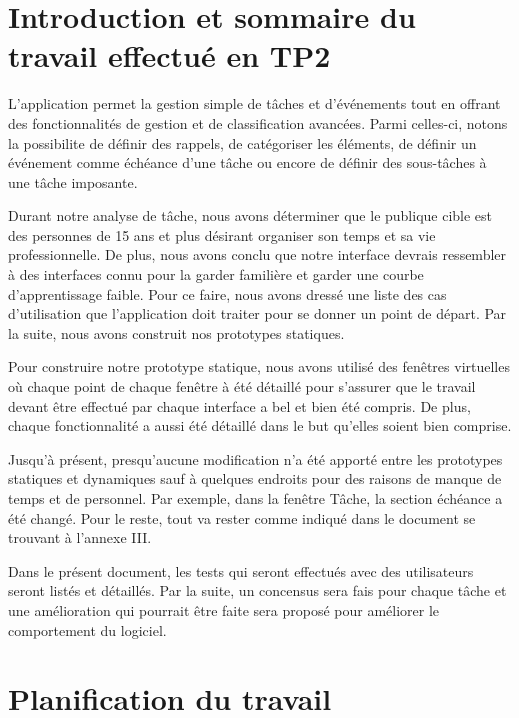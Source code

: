 \documentclass[letterpaper, oneside, 12pt, these, creativecommons]{thETS}
\begin{document}
\chapter{Introduction et sommaire du travail effectué en TP2}

L'application permet la gestion simple de tâches et d'événements tout en offrant des fonctionnalités de gestion et de classification avancées. Parmi celles-ci, notons la possibilite de définir des rappels, de catégoriser les éléments, de définir un événement comme échéance d'une tâche ou encore de définir des sous-tâches à une tâche imposante.

Durant notre analyse de tâche, nous avons déterminer que le publique cible est des personnes de 15 ans et plus désirant organiser son temps et sa vie professionnelle. De plus, nous avons conclu que notre interface devrais ressembler à des interfaces connu pour la garder familière et garder une courbe d'apprentissage faible. Pour ce faire, nous avons dressé une liste des cas d'utilisation que l'application doit traiter pour se donner un point de départ. Par la suite, nous avons construit nos prototypes statiques.

Pour construire notre prototype statique, nous avons utilisé des fenêtres virtuelles où chaque point de chaque fenêtre à été détaillé pour s'assurer que le travail devant être effectué par chaque interface a bel et bien été compris. De plus, chaque fonctionnalité a aussi été détaillé dans le but qu'elles soient bien comprise.

Jusqu'à présent, presqu'aucune modification n'a été apporté entre les prototypes statiques et dynamiques sauf à quelques endroits pour des raisons de manque de temps et de personnel. Par exemple, dans la fenêtre Tâche, la section échéance a été changé. Pour le reste, tout va rester comme indiqué dans le document se trouvant à l'annexe III.

Dans le présent document, les tests qui seront effectués avec des utilisateurs seront listés et détaillés. Par la suite, un concensus sera fais pour chaque tâche et une amélioration qui pourrait être faite sera proposé pour améliorer le comportement du logiciel.

\chapter{Planification du travail}
\end{document}
